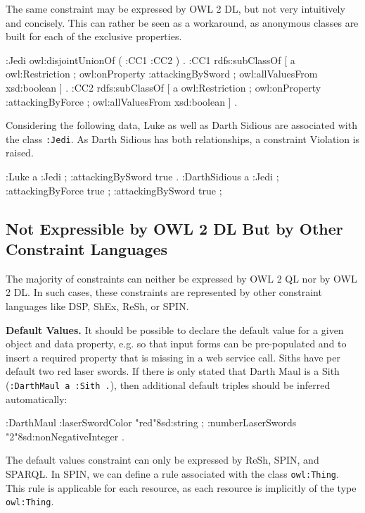 \documentclass{llncs}
\newcommand{\ms}[1]{\texttt{#1}}
\begin{document}
The same constraint may be expressed by OWL 2 DL, but not very intuitively and concisely.
This can rather be seen as a workaround, as anonymous classes are built for each of the exclusive properties.

\begin{ex}
:Jedi owl:disjointUnionOf ( :CC1 :CC2 ) . 
:CC1 rdfs:subClassOf [
    a owl:Restriction ;
    owl:onProperty :attackingBySword ;
    owl:allValuesFrom xsd:boolean ] .
:CC2 rdfs:subClassOf [
    a owl:Restriction ;
    owl:onProperty :attackingByForce ;
    owl:allValuesFrom xsd:boolean ] .
\end{ex}

Considering the following data, Luke as well as Darth Sidious are associated with the class \ms{:Jedi}.
As Darth Sidious has both relationships, a constraint Violation is raised.

\begin{ex}
:Luke
    a :Jedi ; 
    :attackingBySword true .
:DarthSidious
    a :Jedi ; 
    :attackingByForce true ;
    :attackingBySword true ;
\end{ex}

\subsection{Not Expressible by OWL 2 DL But by Other Constraint Languages}

The majority of constraints can neither be expressed by OWL 2 QL nor by OWL 2 DL. 
In such cases, these constraints are represented by other constraint languages like DSP, ShEx, ReSh, or SPIN.

\textbf{Default Values.}
It should be possible to declare the default value for a given object and data property, e.g. so that input forms can be pre-populated and to insert a required property that is missing in a web service call. 
Siths have per default two red laser swords.
If there is only stated that Darth Maul is a Sith (\ms{:DarthMaul a :Sith .}), then additional default triples should be inferred automatically: 

\begin{ex}
:DarthMaul 
    :laserSwordColor "red"^^xsd:string ;
    :numberLaserSwords "2"^^xsd:nonNegativeInteger .
\end{ex}

The default values constraint can only be expressed by ReSh, SPIN, and SPARQL.
In SPIN, we can define a rule associated with the class \ms{owl:Thing}.
This rule is applicable for each resource, as each resource is implicitly of the type \ms{owl:Thing}. 
\end{document}
